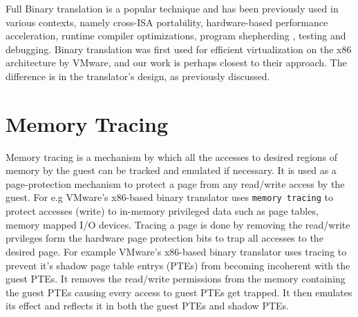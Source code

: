 Full Binary translation is a popular technique and has been previously used in various contexts, namely cross-ISA portability\cite{bansal:osdi08, qemu:software}, hardware-based performance acceleration\cite{transmeta_crusoe:chip}, runtime compiler optimizations\cite{bala00dynamo}, program shepherding \cite{bruening04thesis}, testing and debugging\cite{valgrind}. Binary translation was first used for efficient virtualization on the x86 architecture by VMware\cite{adams:asplos06}, and our work is perhaps closest to their approach. The difference is in the translator's design, as previously discussed.

\section{Memory Tracing}
\label{memory_tracing}
Memory tracing is a mechanism by which all the accesses to desired regions of memory by the guest can be tracked and emulated if necessary. It is used as a page-protection mechanism to protect a page from any read/write access by the guest. For e.g VMware’s x86-based binary translator\cite{adams:asplos06} uses {\tt memory tracing} to protect accesses (write) to in-memory privileged data such as page tables, memory mapped I/O devices. Tracing a page is done by removing the read/write prvileges form the hardware page protection bits to trap all accesses to the desired page. For example VMware’s x86-based binary translator uses tracing to prevent it's shadow page table entrys (PTEs) from becoming incoherent with the guest PTEs. It removes the read/write permissions from the memory containing the guest PTEs causing every access to guest PTEs get trapped. It then emulates its effect and reflects it in both the guest PTEs and shadow PTEs.



